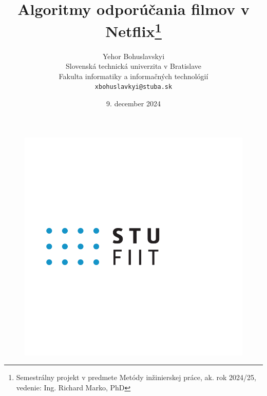 \documentclass[10pt,slovak,a4paper]{article}
\title{Algoritmy odporúčania filmov v Netflix\thanks{Semestrálny projekt v predmete Metódy inžinierskej práce, ak. rok 2024/25, vedenie: Ing. Richard Marko, PhD}}
\author{Yehor Bohuslavskyi\\[2pt]
	{\small Slovenská technická univerzita v Bratislave}\\
	{\small Fakulta informatiky a informačných technológií}\\
	{\small \texttt{xbohuslavkyi@stuba.sk}}
	}
\date{\small 9. december 2024}
\begin{document}
\begin{figure}[h!]
  \centering
  \includegraphics[width=\textwidth]{Images_tables/fiit_logo.png} 
\end{figure}

\maketitle
\end{document}
